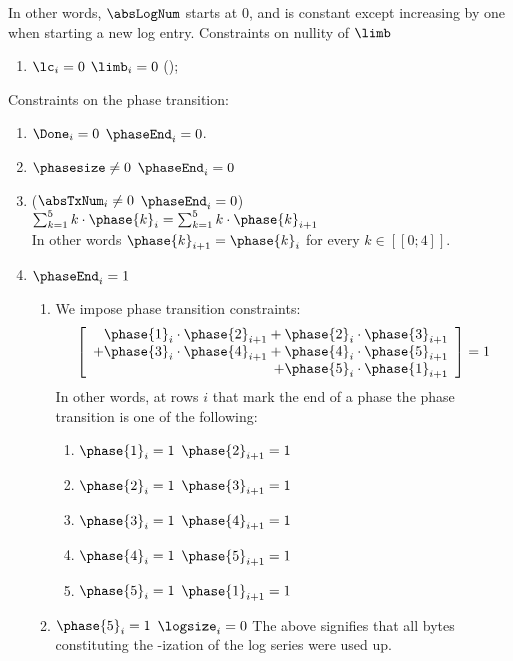 In other words, $\absLogNum$ starts at 0, and is constant except increasing by one when starting a new log entry.
Constraints on nullity of $\limb$
\begin{enumerate}[resume]
    \item \If $\lc_{i}=0$ \Then $\limb_{i}=0$ (\trash);
\end{enumerate}
Constraints on the phase transition:
\begin{enumerate}[resume]
    \item \If $\Done_{i}=0$ \Then $\phaseEnd_{i}=0$.
    \item \If $\phasesize \neq 0$ \Then $\phaseEnd_{i}=0$
    \item \If ($\absTxNum_{i} \neq 0$ \et $\phaseEnd_{i}=0$) \Then $\sum_{k=1}^{5} k \cdot \phase{k}_{i} = \sum_{k=1}^{5} k \cdot \phase{k}_{i+1}$                             \\
        In other words $\phase{k}_{i+1}=\phase{k}_{i}$ for every $k \in [\![ 0 ; 4 ]\!]$.
    \item \If $\phaseEnd_{i}=1$ \Then
        \begin{enumerate}
            \item We impose phase transition constraints:
                \[
                    \left[
                        \begin{array}{r}
                            \phase{1}_{i} \cdot \phase{2}_{i+1}
                            + \phase{2}_{i} \cdot \phase{3}_{i+1} \\
                            + \phase{3}_{i} \cdot \phase{4}_{i+1}
                            + \phase{4}_{i} \cdot \phase{5}_{i+1} \\
                            + \phase{5}_{i} \cdot \phase{1}_{i+1} \\
                        \end{array}
                        \right]
                    = 1
                \]
                In other words, at rows $i$ that mark the end of a phase the phase transition is one of the following:
                \begin{enumerate}
                    \item \If $\phase{1}_{i}=1$ \Then $\phase{2}_{i+1}=1$
                    \item \If $\phase{2}_{i}=1$ \Then $\phase{3}_{i+1}=1$
                    \item \If $\phase{3}_{i}=1$ \Then $\phase{4}_{i+1}=1$
                    \item \If $\phase{4}_{i}=1$ \Then $\phase{5}_{i+1}=1$
                    \item \If $\phase{5}_{i}=1$ \Then $\phase{1}_{i+1}=1$
                \end{enumerate}
            \item \If $\phase{5}_{i}=1$ \Then $\logsize_{i}=0$
                The above signifies that all bytes constituting the \rlp{}-ization of the log series were used up.
        \end{enumerate}
\end{enumerate}

